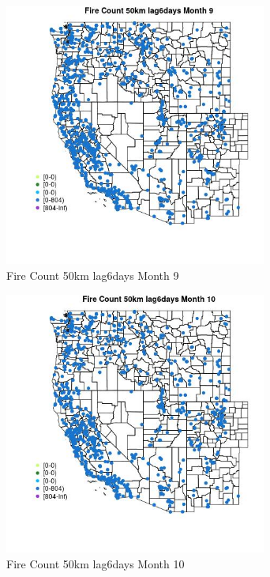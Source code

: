 \begin{figure} 
\centering  
\includegraphics[width=0.77\textwidth]{Code_Outputs/Report_ML_input_PM25_Step4_part_f_de_duplicated_aveswNAs_MapObsMo9Fire_Count_50km_lag6days.jpg} 
\caption{\label{fig:Report_ML_input_PM25_Step4_part_f_de_duplicated_aveswNAsMapObsMo9Fire_Count_50km_lag6days}Fire Count 50km lag6days Month 9} 
\end{figure} 
 

\begin{figure} 
\centering  
\includegraphics[width=0.77\textwidth]{Code_Outputs/Report_ML_input_PM25_Step4_part_f_de_duplicated_aveswNAs_MapObsMo10Fire_Count_50km_lag6days.jpg} 
\caption{\label{fig:Report_ML_input_PM25_Step4_part_f_de_duplicated_aveswNAsMapObsMo10Fire_Count_50km_lag6days}Fire Count 50km lag6days Month 10} 
\end{figure} 
 


